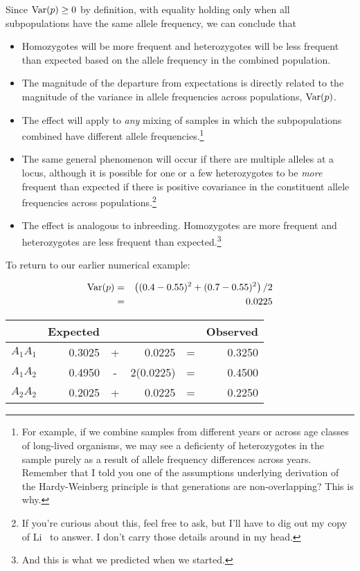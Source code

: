 Since $\hbox{Var}(p) \ge 0$ by definition, with equality holding only
when all subpopulations have the same allele frequency, we can
conclude that

\begin{itemize}

\item Homozygotes will be more frequent and heterozygotes will be less
  frequent than expected based on the allele frequency in the combined
  population.

\item The magnitude of the departure from expectations is directly
  related to the magnitude of the variance in allele frequencies
  across populations, $\hbox{Var}(p)$.

\item The effect will apply to {\it any\/} mixing of samples in which
  the subpopulations combined have different allele
  frequencies.\footnote{For example, if we combine samples from
    different years or across age classes of long-lived organisms, we
    may see a deficienty of heterozygotes in the sample purely as a
    result of allele frequency differences across years. Remember that
    I told you one of the assumptions underlying derivation of the
    Hardy-Weinberg principle is that generations are
    non-overlapping? This is why.}

\item The same general phenomenon will occur if there are multiple
  alleles at a locus, although it is possible for one or a few
  heterozygotes to be {\it more\/} frequent than expected if there is
  positive covariance in the constituent allele frequencies across
  populations.\footnote{If you're curious about this, feel free to
    ask, but I'll have to dig out my copy of Li~\cite{Li-1976} to
    answer. I don't carry those details around in my head.}

\item The effect is analogous to inbreeding. Homozygotes are more
  frequent and heterozygotes are less frequent than
  expected.\footnote{And this is what we predicted when we started.}

\end{itemize}

To return to our earlier numerical example:

\begin{eqnarray}
\hbox{Var}(p) &=& \left((0.4 - 0.55)^2 + (0.7 - 0.55)^2\right)/2 \\
              &=& 0.0225
\end{eqnarray}
\begin{center}
\begin{tabular}{l|rcrcr}
\hline\hline
         & Expected &   &           &   & Observed \\
\hline
$A_1A_1$ &   0.3025 & + &   0.0225  & = &   0.3250 \\
$A_1A_2$ &   0.4950 & - & 2(0.0225) & = &   0.4500 \\
$A_2A_2$ &   0.2025 & + &   0.0225  & = &   0.2250 \\
\hline
\end{tabular}
\end{center}

